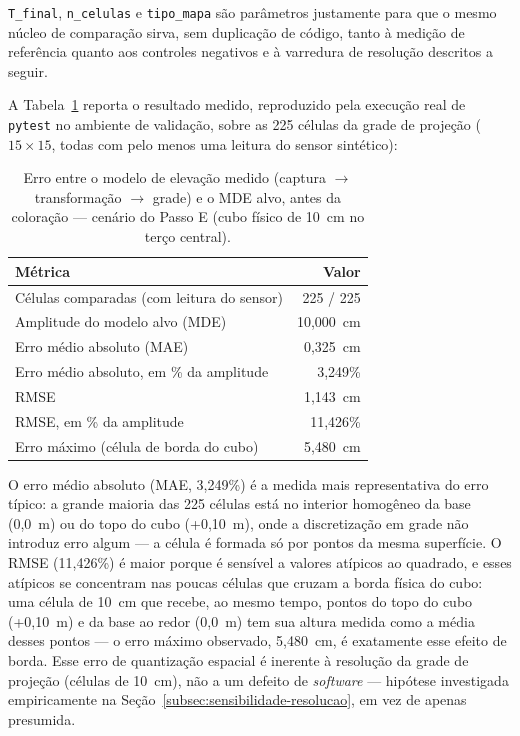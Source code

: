 \noindent \texttt{T\_final}, \texttt{n\_celulas} e \texttt{tipo\_mapa}
são parâmetros justamente para que o mesmo núcleo de comparação sirva,
sem duplicação de código, tanto à medição de referência quanto aos
controles negativos e à varredura de resolução descritos a seguir.

A Tabela~\ref{tab:erro-quantitativo} reporta o resultado medido,
reproduzido pela execução real de \texttt{pytest} no ambiente de
validação, sobre as 225 células da grade de projeção
($15 \times 15$, todas com pelo menos uma leitura do sensor
sintético):

\begin{table}[!ht]
\centering
\caption{Erro entre o modelo de elevação medido (captura $\to$ transformação $\to$ grade) e o MDE alvo, antes da coloração — cenário do Passo E (cubo físico de 10~cm no terço central).}
\label{tab:erro-quantitativo}
\begin{tabular}{@{}lr@{}}
\toprule
\textbf{Métrica} & \textbf{Valor} \\
\midrule
Células comparadas (com leitura do sensor) & 225 / 225 \\
Amplitude do modelo alvo (MDE) & 10,000~cm \\
Erro médio absoluto (MAE) & 0,325~cm \\
Erro médio absoluto, em \% da amplitude & 3,249\% \\
RMSE & 1,143~cm \\
RMSE, em \% da amplitude & 11,426\% \\
Erro máximo (célula de borda do cubo) & 5,480~cm \\
\bottomrule
\end{tabular}
\end{table}

O erro médio absoluto (MAE, 3,249\%) é a medida mais representativa
do erro típico: a grande maioria das 225 células está no interior
homogêneo da base (0,0~m) ou do topo do cubo (+0,10~m), onde a
discretização em grade não introduz erro algum — a célula é formada
só por pontos da mesma superfície. O RMSE (11,426\%) é maior porque é
sensível a valores atípicos ao quadrado, e esses atípicos se
concentram nas poucas células que cruzam a borda física do cubo: uma
célula de 10~cm que recebe, ao mesmo tempo, pontos do topo do cubo
(+0,10~m) e da base ao redor (0,0~m) tem sua altura medida como a
média desses pontos — o erro máximo observado, 5,480~cm, é
exatamente esse efeito de borda. Esse erro de quantização espacial é
inerente à resolução da grade de projeção (células de 10~cm), não a um
defeito de \textit{software} — hipótese investigada empiricamente na
Seção~\ref{subsec:sensibilidade-resolucao}, em vez de apenas presumida.

